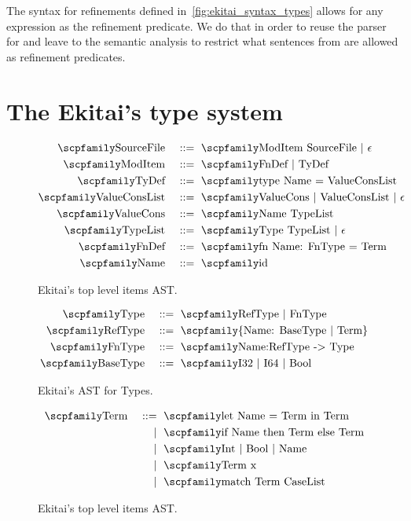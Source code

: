 \documentclass[
  oneside,
  english,
  coorientadorbanca,
  noabntexcite
]{ufsc-thesis-rn46-2019}
\def\bnfdef{::=}
\newcommand{\codett}[1]{\text{\scpfamily#1}}
\newcommand{\code}[1]{\text{\scpfamily\setlength\spaceskip{0.35em}#1}}
\newcommand{\bnfvar}[1]{\codett{#1}}
\newcommand{\bnfor}[1]{{$\mid$} #1}
\newcommand{\bnfmore}[1]{            & \ & \mid{}    & \ \code{#1}}
\newcommand{\astprod}[2]{\code{#1} & \ & \bnfdef{} & \ \code{#2}}
\newcommand{\astmore}[1]{\bnfmore{#1}}
\begin{document}
The syntax for refinements defined in~\cref{fig:ekitai_syntax_types} allows for any expression as the refinement predicate.
We do that in order to reuse the parser for \bnfvar{Expr} and leave to the semantic analysis to restrict what sentences from \bnfvar{Expr} are allowed as refinement predicates.

\section{The Ekitai's type system}

\begin{figure}
  \begin{alignat*}{2}
    \astprod{SourceFile}{ModItem SourceFile \bnfor{$\epsilon$}}          \\
    \astprod{ModItem}{FnDef \bnfor{TyDef}}                               \\
    \astprod{TyDef}{type Name = ValueConsList}                           \\
    \astprod{ValueConsList}{ValueCons | ValueConsList \bnfor{$\epsilon$}} \\
    \astprod{ValueCons}{Name TypeList}                                  \\
    \astprod{TypeList}{Type TypeList \bnfor{$\epsilon$}}                \\
    \astprod{FnDef}{fn Name: FnType = Term}                     \\
    \astprod{Name}{id}
  \end{alignat*}
  \caption{Ekitai's top level items AST.}
\end{figure}

\begin{figure}
  \begin{alignat*}{2}
    \astprod{Type}{RefType \bnfor{FnType}} \\
    \astprod{RefType}{\{Name: BaseType | Term\}} \\
    \astprod{FnType}{Name:RefType -> Type} \\
    \astprod{BaseType}{I32 \bnfor{I64} \bnfor{Bool}}
  \end{alignat*}
  \caption{Ekitai's AST for Types.}
\end{figure}

\begin{figure}
  \begin{alignat*}{2}
    \astprod{Term}{let Name = Term in Term} \\
    \astmore{if Name then Term else Term}   \\
    \astmore{Int \bnfor{Bool} \bnfor{Name}} \\
    \astmore{Term x} \\
    \astmore{match Term CaseList}
  \end{alignat*}
  \caption{Ekitai's top level items AST.}
\end{figure}
\end{document}
